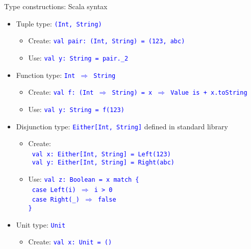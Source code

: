 \documentclass[english]{beamer}
\begin{document}
\begin{frame}{Type constructions: Scala syntax}

\begin{itemize}
\item Tuple type: \texttt{\textcolor{blue}{\footnotesize{}(Int, String)}}{\footnotesize \par}
\begin{itemize}
\item Create: \texttt{\textcolor{blue}{\footnotesize{}val pair:\ (Int,
String) = (123, \textquotedbl{}abc\textquotedbl{})}} 
\item Use: \texttt{\textcolor{blue}{\footnotesize{}val y:\ String = pair.\_2}}{\footnotesize \par}
\end{itemize}
\item Function type: \texttt{\textcolor{blue}{\footnotesize{}Int $\Rightarrow$
String}}{\footnotesize \par}
\begin{itemize}
\item Create: \texttt{\textcolor{blue}{\footnotesize{}val f:\ (Int $\Rightarrow$
String) = x $\Rightarrow$ \textquotedbl{}Value is \textquotedbl{}
+ x.toString}} 
\item Use: \texttt{\textcolor{blue}{\footnotesize{}val y:\ String = f(123)}}{\footnotesize \par}
\end{itemize}
\item Disjunction type: \texttt{\textcolor{blue}{\footnotesize{}Either{[}Int,
String{]}}} defined in standard library
\begin{itemize}
\item Create:\\
 \texttt{\textcolor{blue}{\footnotesize{}\ val x:\ Either{[}Int,
String{]} = Left(123)}}~\\
\texttt{\textcolor{blue}{\footnotesize{} val y:\ Either{[}Int, String{]}
= Right(\textquotedbl{}abc\textquotedbl{})}}{\footnotesize \par}
\item Use: \texttt{\textcolor{blue}{\footnotesize{}val z:\ Boolean = x
match \{}}~\\
\texttt{\textcolor{blue}{\footnotesize{} case Left(i) $\Rightarrow$
i > 0}}~\\
\texttt{\textcolor{blue}{\footnotesize{} case Right(\_) $\Rightarrow$
false}}~\\
\texttt{\textcolor{blue}{\footnotesize{}\}}}{\footnotesize \par}
\end{itemize}
\item Unit type: \texttt{\textcolor{blue}{\footnotesize{}Unit}}{\footnotesize \par}
\begin{itemize}
\item Create: \texttt{\textcolor{blue}{\footnotesize{}val x:\ Unit = ()}}{\footnotesize \par}
\end{itemize}
\end{itemize}
\end{frame}
\end{document}
